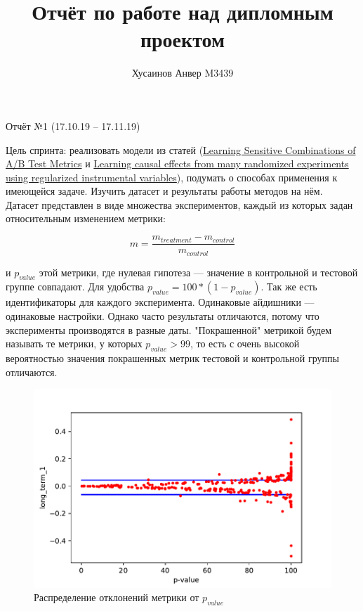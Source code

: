 \documentclass{article}
\title{Отчёт по работе над дипломным проектом}
\author{Хусаинов Анвер M3439}
\begin{document}
	\maketitle
	\begin{center}
		Отчёт №1 (17.10.19 – 17.11.19)
	\end{center}

	
	Цель спринта: реализовать модели из статей (\href{https://research.yandex.com/publications/123}{Learning Sensitive Combinations of A/B Test Metrics} и \href{https://arxiv.org/abs/1701.01140}{Learning causal effects from many randomized experiments using regularized instrumental variables}), подумать о способах применения к имеющейся задаче. Изучить датасет и результаты работы методов на нём. \\
	
	Датасет представлен в виде множества экспериментов, каждый из которых задан относительным изменением метрики:
	
	$$m = \frac{m_{treatment} - m_{control}}{m_{control}}$$
	
	и $p_{value}$ этой метрики, где нулевая гипотеза --- значение в контрольной и тестовой группе совпадают. Для удобства $p_{value} = 100 * (1 - p_{value})$. Так же есть идентификаторы для каждого эксперимента. Одинаковые айдишники --- одинаковые настройки. Однако часто результаты отличаются, потому что эксперименты производятся в разные даты.
	"Покрашенной" метрикой будем называть те метрики, у которых $p_{value} > 99$, то есть с очень высокой вероятностью значения покрашенных метрик тестовой и контрольной группы отличаются. \\
	
	\begin{figure}[h!]
		\includegraphics[scale=1]{thresholds.pdf}
		\caption{Распределение отклонений метрики от $p_{value}$}
		\label{fig:metric1}
	\end{figure}
	
\end{document}
